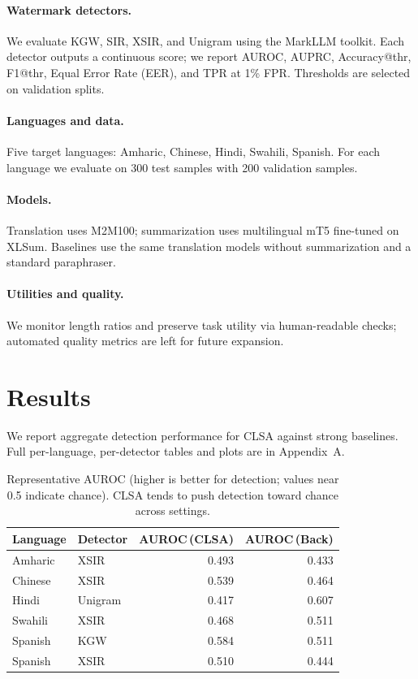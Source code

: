 \documentclass{article}
\begin{document}
\paragraph{Watermark detectors.} We evaluate KGW, SIR, XSIR, and Unigram using the MarkLLM toolkit. Each detector outputs a continuous score; we report AUROC, AUPRC, Accuracy@thr, F1@thr, Equal Error Rate (EER), and TPR at 1\% FPR. Thresholds are selected on validation splits.
\paragraph{Languages and data.} Five target languages: Amharic, Chinese, Hindi, Swahili, Spanish. For each language we evaluate on 300 test samples with 200 validation samples.
\paragraph{Models.} Translation uses M2M100; summarization uses multilingual mT5 fine-tuned on XLSum. Baselines use the same translation models without summarization and a standard paraphraser.
\paragraph{Utilities and quality.} We monitor length ratios and preserve task utility via human-readable checks; automated quality metrics are left for future expansion.

\section{Results}
We report aggregate detection performance for CLSA against strong baselines. Full per-language, per-detector tables and plots are in Appendix~A.

\begin{table}[t]
\centering
\caption{Representative AUROC (higher is better for detection; values near 0.5 indicate chance). CLSA tends to push detection toward chance across settings.}
\label{tab:auroc}
\begin{tabular}{l l r r}
\toprule
Language & Detector & AUROC\,(CLSA) & AUROC\,(Back) \\
\midrule
Amharic & XSIR & 0.493 & 0.433 \\
Chinese & XSIR & 0.539 & 0.464 \\
Hindi & Unigram & 0.417 & 0.607 \\
Swahili & XSIR & 0.468 & 0.511 \\
Spanish & KGW & 0.584 & 0.511 \\
Spanish & XSIR & 0.510 & 0.444 \\
\bottomrule
\end{tabular}
\end{table}
\end{document}
